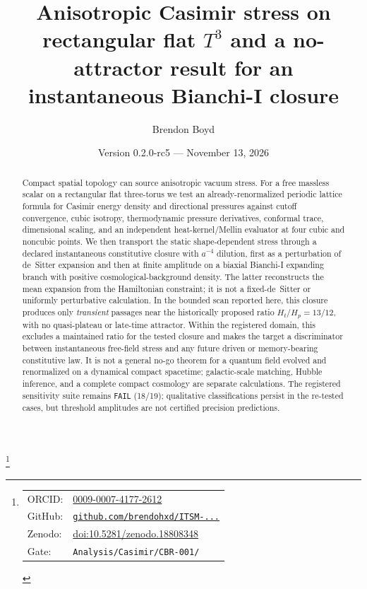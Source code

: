 \documentclass[aps,prd,reprint,superscriptaddress,nofootinbib,floatfix,showkeys]{revtex4-2}
\newcommand{\Tthree}{T^{3}}
\newcommand{\Ht}{H_{t}}
\newcommand{\Hp}{H_{p}}
\begin{document}
\title{Anisotropic Casimir stress on rectangular flat
\texorpdfstring{\(\Tthree\)}{T3} and a no-attractor result for an
instantaneous Bianchi-I closure}

\author{Brendon Boyd}
\thanks{%
\begin{tabular}{@{}l@{\ }l@{}}
ORCID: & \href{https://orcid.org/0009-0007-4177-2612}{0009-0007-4177-2612} \\
GitHub: & \href{https://github.com/brendohxd/ITSM-Integrated-Toroidal-Syntropic-Model}{\texttt{github.com/brendohxd/ITSM-...}} \\
Zenodo: & \href{https://doi.org/10.5281/zenodo.18808348}{doi:10.5281/zenodo.18808348} \\
Gate: & \texttt{Analysis/Casimir/CBR-001/} \\
\end{tabular}%
}

\date{Version 0.2.0-rc5 --- November 13, 2026}

\begin{abstract}
Compact spatial topology can source anisotropic vacuum stress.
For a free massless scalar on a rectangular flat three-torus we test an
already-renormalized periodic lattice formula for Casimir energy density and
directional pressures against cutoff convergence, cubic isotropy,
thermodynamic pressure derivatives, conformal trace, dimensional scaling, and
an independent heat-kernel/Mellin evaluator at four cubic and noncubic points.
We then transport the static shape-dependent stress through a declared
instantaneous constitutive closure with \(a^{-4}\) dilution, first as a
perturbation of de~Sitter expansion and then at finite amplitude on a biaxial
Bianchi-I expanding branch with positive cosmological-background density.
The latter reconstructs the mean expansion from the Hamiltonian constraint;
it is not a fixed-de~Sitter or uniformly perturbative calculation.
In the bounded scan reported here,
this closure produces only \emph{transient} passages near the historically
proposed ratio \(\Ht/\Hp=13/12\), with no quasi-plateau or late-time
attractor.  Within the registered domain, this excludes a maintained ratio
for the tested closure and makes the target a discriminator between
instantaneous free-field stress and any future driven or memory-bearing
constitutive law.  It is not a general no-go theorem for a quantum field
evolved and renormalized on a dynamical compact spacetime; galactic-scale
matching, Hubble inference, and a complete compact cosmology are separate
calculations. The registered sensitivity suite remains \texttt{FAIL}
(18/19); qualitative classifications persist in the re-tested cases, but
threshold amplitudes are not certified precision predictions.
\end{abstract}
\end{document}
